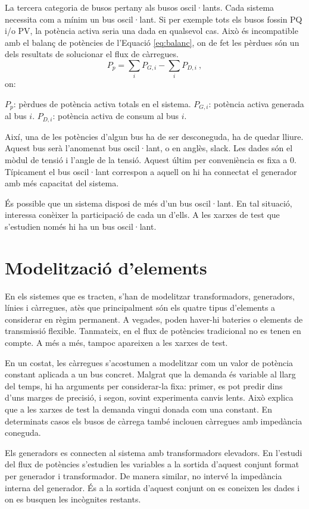 La tercera categoria de busos pertany als busos oscil·lants. Cada sistema necessita com a mínim un bus oscil·lant. Si per exemple tots els busos fossin PQ i/o PV, la potència activa seria una dada en qualsevol cas. Això és incompatible amb el balanç de potències de l'Equació \ref{eq:balanc}, on de fet les pèrdues són un dels resultats de solucionar el flux de càrregues. 
\begin{equation}
    P_{p}=\sum_iP_{G,i}-\sum_iP_{D,i}\ ,
    \label{eq:balanc}
\end{equation}
on:

$P_p$: pèrdues de potència activa totals en el sistema.
\vs
$P_{G,i}$: potència activa generada al bus $i$.
\vs
$P_{D,i}$: potència activa de consum al bus $i$.

Així, una de les potències d'algun bus ha de ser desconeguda, ha de quedar lliure. Aquest bus serà l'anomenat bus oscil·lant, o en anglès, slack. Les dades són el mòdul de tensió i l'angle de la tensió. Aquest últim per conveniència es fixa a 0. Típicament el bus oscil·lant correspon a aquell on hi ha connectat el generador amb més capacitat del sistema.

És possible que un sistema disposi de més d'un bus oscil·lant. En tal situació, interessa conèixer la participació de cada un d'ells. A les xarxes de test que s'estudien només hi ha un bus oscil·lant. 

\section{Modelització d'elements}
En els sistemes que es tracten, s'han de modelitzar transformadors, generadors, línies i càrregues, atès que principalment són els quatre tipus d'elements a considerar en règim permanent. A vegades, poden haver-hi bateries o elements de transmissió flexible. Tanmateix, en el flux de potències tradicional no es tenen en compte. A més a més, tampoc apareixen a les xarxes de test. 

En un costat, les càrregues s'acostumen a modelitzar com un valor de potència constant aplicada a un bus concret. Malgrat que la demanda és variable al llarg del temps, hi ha arguments per considerar-la fixa: primer, es pot predir dins d'uns marges de precisió, i segon, sovint experimenta canvis lents. Això explica que a les xarxes de test la demanda vingui donada com una constant. En determinats casos els busos de càrrega també inclouen càrregues amb impedància coneguda.

Els generadors es connecten al sistema amb transformadors elevadors. En l'estudi del flux de potències s'estudien les variables a la sortida d'aquest conjunt format per generador i transformador. De manera similar, no intervé la impedància interna del generador. És a la sortida d'aquest conjunt on es coneixen les dades i on es busquen les incògnites restants.

